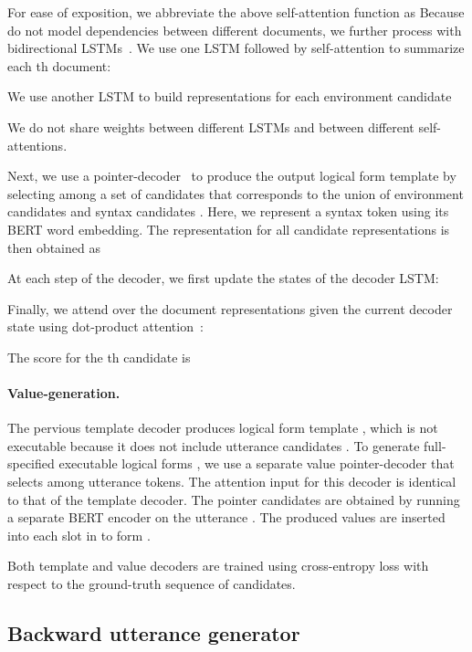 \documentclass[11pt,a4paper]{article}
\begin{document}
For ease of exposition, we abbreviate the above self-attention function as 
Because  do not model dependencies between different documents, we further process  with bidirectional LSTMs~\citep{Hochreiter1997LongSM}.
We use one LSTM followed by self-attention to summarize each th document:

We use another LSTM to build representations for each environment candidate 

We do not share weights between different LSTMs and between different self-attentions.

Next, we use a pointer-decoder~\citep{vinyals-pointer_networks} to produce the output logical form template  by selecting among a set of candidates that corresponds to the union of environment candidates  and syntax candidates .
Here, we represent a syntax token using its BERT word embedding.
The representation for all candidate representations  is then obtained as

At each step  of the decoder, we first update the states of the decoder LSTM:

Finally, we attend over the document representations given the current decoder state using dot-product attention~\citep{bahdanau-align_and_translate}:

The score for the th candidate  is



\paragraph{Value-generation.}
The pervious template decoder produces logical form template , which is not executable because it does not include utterance candidates .
To generate full-specified executable logical forms , we use a separate value pointer-decoder that selects among utterance tokens.
The attention input for this decoder is identical to that of the template decoder.
The pointer candidates  are obtained by running a separate BERT encoder on the utterance .
The produced values are inserted into each slot in  to form .

Both template and value decoders are trained using cross-entropy loss with respect to the ground-truth sequence of candidates.





\subsection{Backward utterance generator}
\label{sec:generator}
\end{document}
